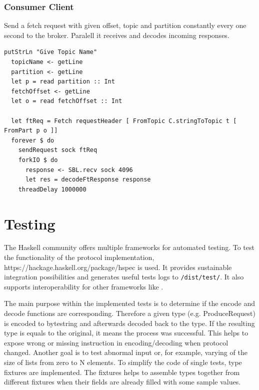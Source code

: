 \subsubsection{Consumer Client}
Send a fetch request with given offset, topic and partition constantly every one
second to the broker. Paralell it receives and decodes incoming responses.
\begin{lstlisting}[caption={Consumer client example}]
putStrLn "Give Topic Name"
  topicName <- getLine
  partition <- getLine
  let p = read partition :: Int
  fetchOffset <- getLine
  let o = read fetchOffset :: Int

  let ftReq = Fetch requestHeader [ FromTopic C.stringToTopic t [ FromPart p o ]]
  forever $ do
    sendRequest sock ftReq
    forkIO $ do
      response <- SBL.recv sock 4096
      let res = decodeFtResponse response
    threadDelay 1000000
\end{lstlisting}

\newpage
\section{Testing}

The Haskell community offers multiple frameworks for automated testing. To test
the functionality of the protocol implementation, 
{https://hackage.haskell.org/package/hspec} is used. It provides sustainable
integration possibilities and generates useful tests logs to
\lstinline{/dist/test/}. It also supports interoperability for other frameworks
like .

The main purpose within the implemented tests is to determine if the encode and decode
functions are corresponding. Therefore a given type (e.g. ProduceRequest) is
encoded to bytestring and afterwards decoded back to the type. If the resulting
type is equals to the original, it means the process was successful. This helps to
expose wrong or missing instruction in encoding/decoding when protocol
changed. Another goal is to test abnormal input or, for example, varying 
of the size of lists from zero to N elements. To simplify the code of
single tests, type fixtures are implemented. The fixtures helps to assemble
types together from different fixtures when their fields are already filled
with some sample values. 

